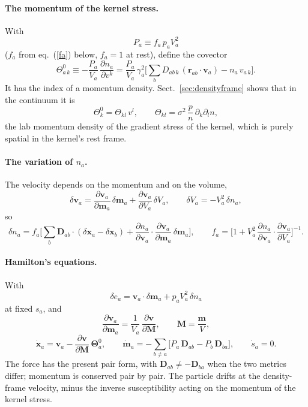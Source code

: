\documentclass[11pt,aps,preprint,nofootinbib,superscriptaddress,tightenlines]{revtex4-2}
\def\st{\begin{equation}}
\def\stp{\end{equation}}
\def\Eq#1{eq.~(\ref{#1})}
\def\Sect#1{Sect.~\ref{#1}}
\let\oldparagraph\paragraph
\renewcommand{\paragraph}{\par\bigskip\oldparagraph}
\begin{document}
\paragraph{The momentum of the kernel stress.}  With
\st
P_a\equiv f_a\,p_aV_a^2
\stp
($f_a$ from \Eq{fa} below, $f_a=1$ at rest), define the covector
\st
\boxed{\;
\Theta^0_{a\,k}\equiv-\frac{P_a}{V_a}\,\frac{\partial n_a}{\partial v^k}
=\frac{P_a}{V_a}\,\gamma_a^2\Big[\sum_bD_{ab\,k}\,(\bm r_{ab}\cdot\bm v_a)-n_a\,v_{a\,k}\Big] .\;}
\label{Theta0}
\stp
It has the index of a momentum density.  \Sect{sec:densityframe} shows that in the continuum it is
\st
\Theta^0_k=\Theta_{kl}\,v^l,\qquad \Theta_{kl}=\sigma^2\,\frac{p}{n}\,\partial_k\partial_ln ,
\stp
the lab momentum density of the gradient stress of the kernel, which is purely spatial in the kernel's rest frame.

\paragraph{The variation of $n_a$.}  The velocity depends on the momentum and on the volume,
\st
\delta\bm v_a=\frac{\partial\bm v_a}{\partial\bm m_a}\,\delta\bm m_a+\frac{\partial\bm v_a}{\partial V_a}\,\delta V_a,\qquad
\delta V_a=-V_a^2\,\delta n_a ,
\stp
so
\st
\delta n_a=f_a\Big[\sum_b\bm D_{ab}\cdot(\delta\bm x_a-\delta\bm x_b)+\frac{\partial n_a}{\partial\bm v_a}\cdot\frac{\partial\bm v_a}{\partial\bm m_a}\,\delta\bm m_a\Big],\qquad
f_a=\Big[1+V_a^2\,\frac{\partial n_a}{\partial\bm v_a}\cdot\frac{\partial\bm v_a}{\partial V_a}\Big]^{-1} .
\label{fa}
\stp

\paragraph{Hamilton's equations.}  With
\st
\delta e_a=\bm v_a\cdot\delta\bm m_a+p_aV_a^2\,\delta n_a
\stp
at fixed $s_a$, and
\st
\frac{\partial\bm v_a}{\partial\bm m_a}=\frac1{V_a}\,\frac{\partial\bm v}{\partial\bm M},\qquad \bm M=\frac{\bm m}{V},
\stp
\st
\boxed{\;
\dot{\bm x}_a=\bm v_a-\frac{\partial\bm v}{\partial\bm M}\,\bm\Theta^0_a,\qquad
\dot{\bm m}_a=-\sum_{b\neq a}\Big[P_a\,\bm D_{ab}-P_b\,\bm D_{ba}\Big],\qquad
\dot s_a=0 .\;}
\label{eom}
\stp
The force has the present pair form, with $\bm D_{ab}\neq-\bm D_{ba}$ when the two metrics differ; momentum is conserved pair by pair.
The particle drifts at the density-frame velocity, minus the inverse susceptibility acting on the momentum of the kernel stress.
\end{document}
